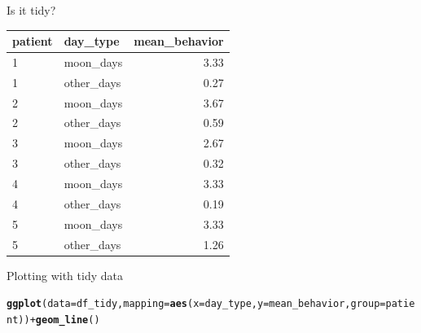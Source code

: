 \documentclass[10pt,handout]{beamer}\usepackage[]{graphicx}\usepackage[]{color}
\makeatletter
\newcommand{\hlopt}[1]{\textcolor[rgb]{0,0,0}{#1}}%
\newcommand{\hlstd}[1]{\textcolor[rgb]{0.345,0.345,0.345}{#1}}%
\newcommand{\hlkwc}[1]{\textcolor[rgb]{0.333,0.667,0.333}{#1}}%
\newcommand{\hlkwd}[1]{\textcolor[rgb]{0.737,0.353,0.396}{\textbf{#1}}}%
\newenvironment{kframe}{%
 \def\at@end@of@kframe{}%
 \ifinner\ifhmode%
  \def\at@end@of@kframe{\end{minipage}}%
  \begin{minipage}{\columnwidth}%
 \fi\fi%
 \def\FrameCommand##1{\hskip\@totalleftmargin \hskip-\fboxsep
 \colorbox{shadecolor}{##1}\hskip-\fboxsep
     \hskip-\linewidth \hskip-\@totalleftmargin \hskip\columnwidth}%
 \MakeFramed {\advance\hsize-\width
   \@totalleftmargin\z@ \linewidth\hsize
   \@setminipage}}%
 {\par\unskip\endMakeFramed%
 \at@end@of@kframe}
\newenvironment{knitrout}{}{} %
\makeatother
\begin{document}
\begin{frame}[fragile]{Is it tidy?}
	
\begin{knitrout}\footnotesize
{}\color{fgcolor}
\begin{tabular}{l|l|r}
\hline
patient & day\_type & mean\_behavior\\
\hline
1 & moon\_days & 3.33\\
\hline
1 & other\_days & 0.27\\
\hline
2 & moon\_days & 3.67\\
\hline
2 & other\_days & 0.59\\
\hline
3 & moon\_days & 2.67\\
\hline
3 & other\_days & 0.32\\
\hline
4 & moon\_days & 3.33\\
\hline
4 & other\_days & 0.19\\
\hline
5 & moon\_days & 3.33\\
\hline
5 & other\_days & 1.26\\
\hline
\end{tabular}


\end{knitrout}
	
	
\end{frame}


\begin{frame}[fragile]{Plotting with tidy data}
	
\begin{knitrout}\tiny
{}\color{fgcolor}\begin{kframe}
\begin{alltt}
\hlkwd{ggplot}\hlstd{(}\hlkwc{data} \hlstd{= df_tidy,} \hlkwc{mapping} \hlstd{=} \hlkwd{aes}\hlstd{(}\hlkwc{x} \hlstd{= day_type,} \hlkwc{y} \hlstd{= mean_behavior,} \hlkwc{group} \hlstd{= patient))} \hlopt{+} \hlkwd{geom_line}\hlstd{()}
\end{alltt}
\end{kframe}
\end{knitrout}
	
\begin{knitrout}\tiny
{}\color{fgcolor}\begin{kframe}


{\ttfamily\noindent\bfseries\color{errorcolor}{Error in loadNamespace(name): there is no package called 'ggpubr'}}\end{kframe}
\end{knitrout}
	
	
\end{frame}
\end{document}
